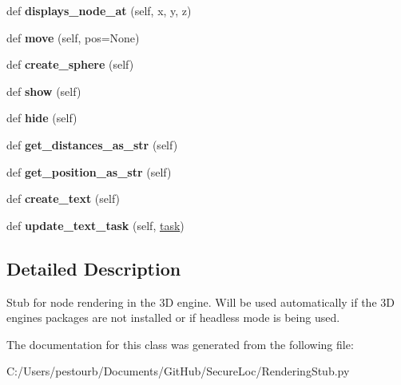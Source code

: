 \begin{DoxyCompactItemize}
\item 
\mbox{\label{class_rendering_stub_1_1_rendered_node_ae5715012ca52873018e51a9c4db43f7c}} 
def {\bfseries displays\+\_\+node\+\_\+at} (self, x, y, z)
\item 
\mbox{\label{class_rendering_stub_1_1_rendered_node_a6feb931cbee18d2d59c63986d969cc22}} 
def {\bfseries move} (self, pos=None)
\item 
\mbox{\label{class_rendering_stub_1_1_rendered_node_a499bd755942d1f9234b6b5aedcc21801}} 
def {\bfseries create\+\_\+sphere} (self)
\item 
\mbox{\label{class_rendering_stub_1_1_rendered_node_ab4f4398c3f210fe4ea6e720401357691}} 
def {\bfseries show} (self)
\item 
\mbox{\label{class_rendering_stub_1_1_rendered_node_ac3c535fd36dc5473ff98017920898352}} 
def {\bfseries hide} (self)
\item 
\mbox{\label{class_rendering_stub_1_1_rendered_node_a6a5edcc7b40b4e6cb4057afc9e6a4025}} 
def {\bfseries get\+\_\+distances\+\_\+as\+\_\+str} (self)
\item 
\mbox{\label{class_rendering_stub_1_1_rendered_node_a2456c7486bc468bd6b0e9277336f6453}} 
def {\bfseries get\+\_\+position\+\_\+as\+\_\+str} (self)
\item 
\mbox{\label{class_rendering_stub_1_1_rendered_node_a0f92537796b85454021dd7ce8e55a3fa}} 
def {\bfseries create\+\_\+text} (self)
\item 
\mbox{\label{class_rendering_stub_1_1_rendered_node_a960251572481fb35d40b7f784de22232}} 
def {\bfseries update\+\_\+text\+\_\+task} (self, \mbox{\hyperlink{class_rendering_stub_1_1task}{task}})
\end{DoxyCompactItemize}


\subsection{Detailed Description}
\begin{DoxyVerb}Stub for node rendering in the 3D engine.
Will be used automatically if the 3D engines packages are not installed
or if headless mode is being used.\end{DoxyVerb}
 

The documentation for this class was generated from the following file\+:\begin{DoxyCompactItemize}
\item 
C\+:/\+Users/pestourb/\+Documents/\+Git\+Hub/\+Secure\+Loc/Rendering\+Stub.\+py\end{DoxyCompactItemize}
